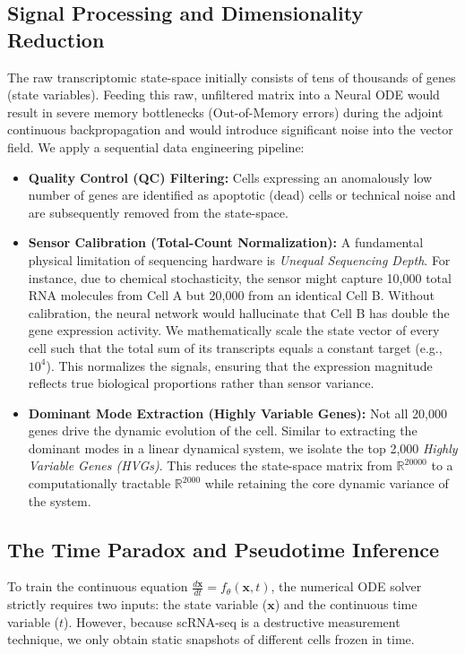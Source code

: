 \documentclass[12pt, a4paper]{article}
\begin{document}
	\subsection{Signal Processing and Dimensionality Reduction}
	The raw transcriptomic state-space initially consists of tens of thousands of genes (state variables). Feeding this raw, unfiltered matrix into a Neural ODE would result in severe memory bottlenecks (Out-of-Memory errors) during the adjoint continuous backpropagation and would introduce significant noise into the vector field. We apply a sequential data engineering pipeline:
	
	\begin{itemize}
		\item \textbf{Quality Control (QC) Filtering:} Cells expressing an anomalously low number of genes are identified as apoptotic (dead) cells or technical noise and are subsequently removed from the state-space.
		\item \textbf{Sensor Calibration (Total-Count Normalization):} A fundamental physical limitation of sequencing hardware is \textit{Unequal Sequencing Depth}. For instance, due to chemical stochasticity, the sensor might capture 10,000 total RNA molecules from Cell A but 20,000 from an identical Cell B. Without calibration, the neural network would hallucinate that Cell B has double the gene expression activity. We mathematically scale the state vector of every cell such that the total sum of its transcripts equals a constant target (e.g., $10^4$). This normalizes the signals, ensuring that the expression magnitude reflects true biological proportions rather than sensor variance.
		\item \textbf{Dominant Mode Extraction (Highly Variable Genes):} Not all 20,000 genes drive the dynamic evolution of the cell. Similar to extracting the dominant modes in a linear dynamical system, we isolate the top 2,000 \textit{Highly Variable Genes (HVGs)}. This reduces the state-space matrix from $\mathbb{R}^{20000}$ to a computationally tractable $\mathbb{R}^{2000}$ while retaining the core dynamic variance of the system.
	\end{itemize}
	
	\subsection{The Time Paradox and Pseudotime Inference}
	To train the continuous equation $\frac{d\mathbf{x}}{dt} = f_\theta(\mathbf{x}, t)$, the numerical ODE solver strictly requires two inputs: the state variable ($\mathbf{x}$) and the continuous time variable ($t$). However, because scRNA-seq is a destructive measurement technique, we only obtain static snapshots of different cells frozen in time. 
	
\end{document}
